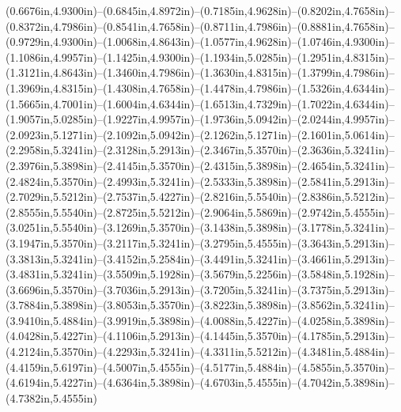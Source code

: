 (0.6676in,4.9300in)--(0.6845in,4.8972in)--(0.7185in,4.9628in)--(0.8202in,4.7658in)--(0.8372in,4.7986in)--(0.8541in,4.7658in)--(0.8711in,4.7986in)--(0.8881in,4.7658in)--(0.9729in,4.9300in)--(1.0068in,4.8643in)--(1.0577in,4.9628in)--(1.0746in,4.9300in)--(1.1086in,4.9957in)--(1.1425in,4.9300in)--(1.1934in,5.0285in)--(1.2951in,4.8315in)--(1.3121in,4.8643in)--(1.3460in,4.7986in)--(1.3630in,4.8315in)--(1.3799in,4.7986in)--(1.3969in,4.8315in)--(1.4308in,4.7658in)--(1.4478in,4.7986in)--(1.5326in,4.6344in)--(1.5665in,4.7001in)--(1.6004in,4.6344in)--(1.6513in,4.7329in)--(1.7022in,4.6344in)--(1.9057in,5.0285in)--(1.9227in,4.9957in)--(1.9736in,5.0942in)--(2.0244in,4.9957in)--(2.0923in,5.1271in)--(2.1092in,5.0942in)--(2.1262in,5.1271in)--(2.1601in,5.0614in)--(2.2958in,5.3241in)--(2.3128in,5.2913in)--(2.3467in,5.3570in)--(2.3636in,5.3241in)--(2.3976in,5.3898in)--(2.4145in,5.3570in)--(2.4315in,5.3898in)--(2.4654in,5.3241in)--(2.4824in,5.3570in)--(2.4993in,5.3241in)--(2.5333in,5.3898in)--(2.5841in,5.2913in)--(2.7029in,5.5212in)--(2.7537in,5.4227in)--(2.8216in,5.5540in)--(2.8386in,5.5212in)--(2.8555in,5.5540in)--(2.8725in,5.5212in)--(2.9064in,5.5869in)--(2.9742in,5.4555in)--(3.0251in,5.5540in)--(3.1269in,5.3570in)--(3.1438in,5.3898in)--(3.1778in,5.3241in)--(3.1947in,5.3570in)--(3.2117in,5.3241in)--(3.2795in,5.4555in)--(3.3643in,5.2913in)--(3.3813in,5.3241in)--(3.4152in,5.2584in)--(3.4491in,5.3241in)--(3.4661in,5.2913in)--(3.4831in,5.3241in)--(3.5509in,5.1928in)--(3.5679in,5.2256in)--(3.5848in,5.1928in)--(3.6696in,5.3570in)--(3.7036in,5.2913in)--(3.7205in,5.3241in)--(3.7375in,5.2913in)--(3.7884in,5.3898in)--(3.8053in,5.3570in)--(3.8223in,5.3898in)--(3.8562in,5.3241in)--(3.9410in,5.4884in)--(3.9919in,5.3898in)--(4.0088in,5.4227in)--(4.0258in,5.3898in)--(4.0428in,5.4227in)--(4.1106in,5.2913in)--(4.1445in,5.3570in)--(4.1785in,5.2913in)--(4.2124in,5.3570in)--(4.2293in,5.3241in)--(4.3311in,5.5212in)--(4.3481in,5.4884in)--(4.4159in,5.6197in)--(4.5007in,5.4555in)--(4.5177in,5.4884in)--(4.5855in,5.3570in)--(4.6194in,5.4227in)--(4.6364in,5.3898in)--(4.6703in,5.4555in)--(4.7042in,5.3898in)--(4.7382in,5.4555in)
